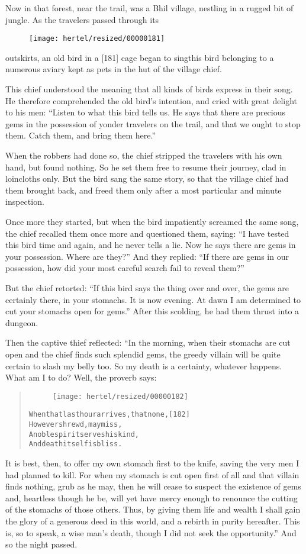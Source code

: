 \documentclass[article, twoside, 10pt]{memoir}
\renewenvironment{verbatim}{%
\begin{quote}%
\vskip -10pt%
\begin{alltt}\normalfont\small}{\end{alltt}%
\end{quote}%
\vskip -10pt
} %
\begin{document}
Now in that forest, near the trail, was a Bhil village, nestling in
a rugged bit of jungle. As the travelers passed through its
\begin{figure}[p]\texttt{[image: hertel/resized/00000181]}\end{figure}outskirts, an old bird in a [181] cage began to sing{\textemdash}this bird
belonging to a numerous aviary kept as pets in the hut of the
village chief.

This chief understood the meaning that all kinds of birds express
in their song. He therefore comprehended the old bird's intention,
and cried with great delight to his men:
``Listen to what this bird tells us. He says that there are precious gems in the possession of yonder travelers on the trail, and that we ought to stop them. Catch them, and bring them here.''

When the robbers had done so, the chief stripped the travelers with
his own hand, but found nothing. So he set them free to resume
their journey, clad in loincloths only. But the bird sang the same
story, so that the village chief had them brought back, and freed
them only after a most particular and minute inspection.

Once more they started, but when the bird impatiently screamed the
same song, the chief recalled them once more and questioned them,
saying:
``I have tested this bird time and again, and he never tells a lie. Now he says there are gems in your possession. Where are they?''
And they replied:
``If there are gems in our possession, how did your most careful search fail to reveal them?''

But the chief retorted:
``If this bird says the thing over and over, the gems are certainly there, in your stomachs. It is now evening. At dawn I am determined to cut your stomachs open for gems.''
After this scolding, he had them thrust into a dungeon.

Then the captive thief reflected: “In the morning, when their
stomachs are cut open and the chief finds such splendid gems, the
greedy villain will be quite certain to slash my belly too. So my
death is a certainty, whatever happens. What am I to do? Well, the
proverb says:

\begin{verbatim}
\begin{figure}[p]\texttt{[image: hertel/resized/00000182]}\end{figure}When that last hour arrives, that none,                 [182]
    However shrewd, may miss,
A noble spirit serves his kind,
    And death itself is bliss.
\end{verbatim}
It is best, then, to offer my own stomach first to the knife,
saving the very men I had planned to kill. For when my stomach is
cut open first of all and that villain finds nothing, grub as he
may, then he will cease to suspect the existence of gems and,
heartless though he be, will yet have mercy enough to renounce the
cutting of the stomachs of those others. Thus, by giving them life
and wealth I shall gain the glory of a generous deed in this world,
and a rebirth in purity hereafter. This is, so to speak, a wise
man's death, though I did not seek the opportunity.” And so the
night passed.
\end{document}
